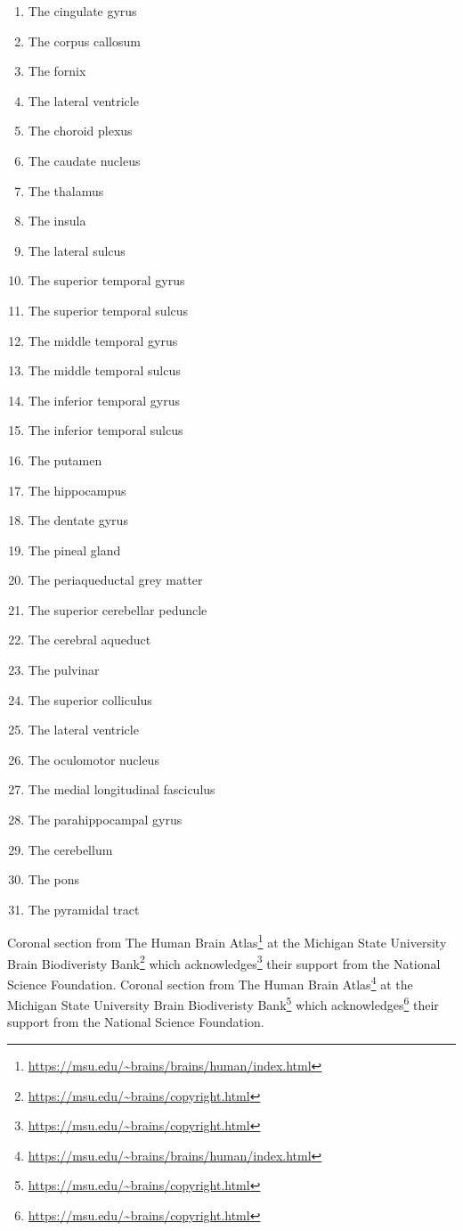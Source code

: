 \documentclass[]{book}
\providecommand{\tightlist}{%
  \setlength{\itemsep}{0pt}\setlength{\parskip}{0pt}}
\let\rmarkdownfootnote\footnote%
\def\footnote{\protect\rmarkdownfootnote}
\renewcommand{\href}[2]{#2\footnote{\url{#1}}}
\begin{document}
\begin{enumerate}
\def\labelenumi{\arabic{enumi}.}
\tightlist
\item
  The cingulate gyrus
\item
  The corpus callosum
\item
  The fornix
\item
  The lateral ventricle
\item
  The choroid plexus
\item
  The caudate nucleus
\item
  The thalamus
\item
  The insula
\item
  The lateral sulcus
\item
  The superior temporal gyrus
\item
  The superior temporal sulcus
\item
  The middle temporal gyrus
\item
  The middle temporal sulcus
\item
  The inferior temporal gyrus
\item
  The inferior temporal sulcus
\item
  The putamen
\item
  The hippocampus
\item
  The dentate gyrus
\item
  The pineal gland
\item
  The periaqueductal grey matter
\item
  The superior cerebellar peduncle
\item
  The cerebral aqueduct
\item
  The pulvinar
\item
  The superior colliculus
\item
  The lateral ventricle
\item
  The oculomotor nucleus
\item
  The medial longitudinal fasciculus
\item
  The parahippocampal gyrus
\item
  The cerebellum
\item
  The pons
\item
  The pyramidal tract
\end{enumerate}

Coronal section from \href{https://msu.edu/~brains/brains/human/index.html}{The Human Brain Atlas} at the \href{https://msu.edu/~brains/copyright.html}{Michigan State University Brain Biodiveristy Bank} which \href{https://msu.edu/~brains/copyright.html}{acknowledges} their support from the National Science Foundation. Coronal section from \href{https://msu.edu/~brains/brains/human/index.html}{The Human Brain Atlas} at the \href{https://msu.edu/~brains/copyright.html}{Michigan State University Brain Biodiveristy Bank} which \href{https://msu.edu/~brains/copyright.html}{acknowledges} their support from the National Science Foundation.
\end{document}
